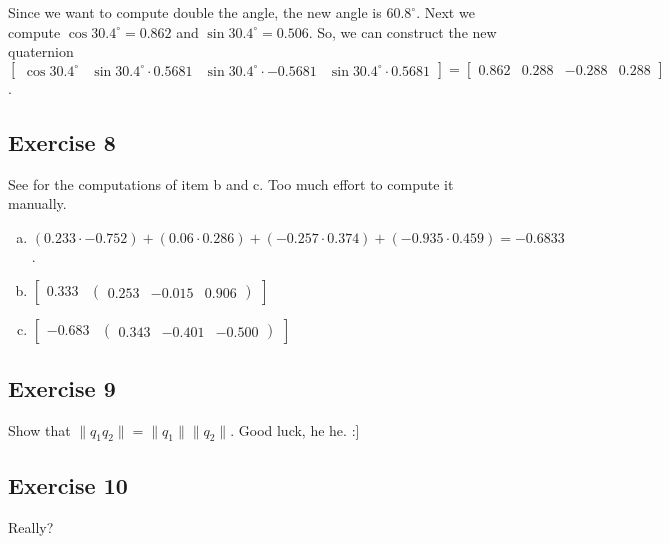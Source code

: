 \documentclass[11pt]{article}
\begin{document}
Since we want to compute double the angle, the new angle is $60.8^\circ$. Next we compute $\cos30.4^\circ=0.862$ and $\sin30.4^\circ=0.506$. So, we can construct the new quaternion $\begin{bmatrix}
\cos30.4^\circ & \sin30.4^\circ\cdot0.5681 & \sin30.4^\circ\cdot-0.5681 & \sin30.4^\circ\cdot0.5681
\end{bmatrix}=\begin{bmatrix}
	0.862 & 0.288 & -0.288 & 0.288
\end{bmatrix}$.

\subsection{Exercise 8}

See  for the computations of item b and c. Too much effort to compute it manually.

\begin{enumerate}[a.]
	\item %
	$(0.233\cdot-0.752)+(0.06\cdot0.286)+(-0.257\cdot0.374)+(-0.935\cdot0.459)=-0.6833$.
	\item %
	$\begin{bmatrix}
		0.333 & \begin{pmatrix}
			0.253 & -0.015 & 0.906
		\end{pmatrix}
	\end{bmatrix}$
	\item %
	$\begin{bmatrix}
		-0.683 & \begin{pmatrix}
			0.343 & -0.401 & -0.500
		\end{pmatrix}
	\end{bmatrix}$
\end{enumerate}

\subsection{Exercise 9}

Show that $\|q_1q_2\|=\|q_1\|\|q_2\|$. Good luck, he he. :]

\subsection{Exercise 10}

Really?
\end{document}
